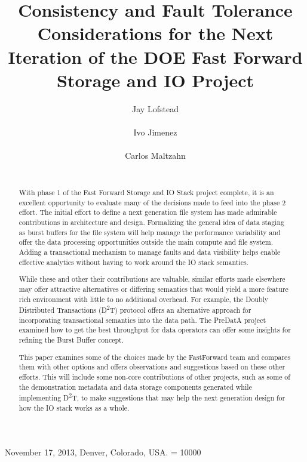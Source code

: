 \documentclass[conference]{sig-alt-gov2}
\newcommand{\DDTns}{D\textsuperscript{2}T}
\begin{document}
 {November 17, 2013, Denver, Colorado, USA.}
\widowpenalty = 10000

\title{Consistency and Fault Tolerance Considerations for the Next Iteration of the DOE Fast Forward Storage and IO Project}

\author{
\alignauthor Jay Lofstead\\
       \\
\alignauthor Ivo Jimenez\\
       \\
\alignauthor Carlos Maltzahn\\
       \\
}
\maketitle

\begin{abstract}
With phase 1 of the Fast Forward Storage and IO Stack project complete, it is
an excellent opportunity to evaluate many of the decisions made to feed into
the phase 2 effort. The initial effort to define a next generation file system
has made admirable contributions in architecture and design. Formalizing the
general idea of data staging as burst buffers for the file system will help
manage the performance variability and offer the data processing opportunities
outside the main compute and file system. Adding a transactional mechanism to
manage faults and data visibility helps enable effective analytics without
having to work around the IO stack semantics.

While these and other their contributions are valuable, similar efforts made
elsewhere may offer attractive alternatives or differing semantics that would
yield a more feature rich environment with little to no additional overhead.
For example, the Doubly Distributed Transactions (\DDTns) protocol offers an
alternative approach for incorporating transactional semantics into the data
path. The PreDatA project examined how to get the best throughput for data
operators can offer some insights for refining the Burst Buffer concept.

This paper examines some of the choices made by the FastForward team and
compares them with other options and offers observations and suggestions based
on these other efforts.  This will include some non-core contributions of other
projects, such as some of the demonstration metadata and data storage
components generated while implementing \DDTns, to make suggestions that may
help the next generation design for how the IO stack works as a whole.

\end{abstract}
\end{document}
